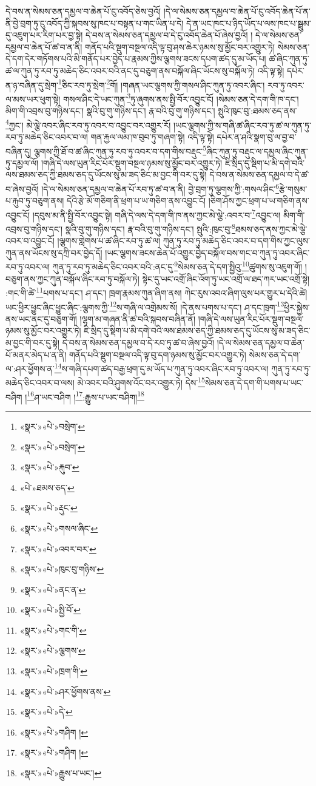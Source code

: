 དེ་བས་ན་སེམས་ཅན་དམྱལ་བ་ཆེན་པོ་ངུ་འབོད་ཅེས་བྱའོ། །དེ་ལ་སེམས་ཅན་དམྱལ་བ་ཆེན་པོ་ངུ་འབོད་ཆེན་པོ་ན་ནི་བྱེ་བྲག་ཏུ་ངུ་འབོད་ཀྱི་སྐབས་སུ་ཁང་པ་བསྟན་པ་གང་ཡིན་པ་དེ། དེ་ན་ཡང་ཁང་པ་ཉིད་ཡོད་པ་ལས་ཁང་པ་སྦྲུམ་དུ་འཇུག་པར་རིག་པར་བྱ་སྟེ། དེ་བས་ན་སེམས་ཅན་དམྱལ་བ་དེ་ངུ་འབོད་ཆེན་པོ་ཞེས་བྱའོ། །
དེ་ལ་སེམས་ཅན་དམྱལ་བ་ཆེན་པོ་ཚ་བ་ན་ནི། གནོད་པའི་སྡུག་བསྔལ་འདི་ལྟ་བུ་ཤས་ཆེར་ཉམས་སུ་མྱོང་བར་འགྱུར་ཏེ། སེམས་ཅན་དེ་དག་དེར་གཏོགས་པའི་མི་གནོད་པར་བྱེད་པ་རྣམས་ཀྱིས་ལྕགས་ཟངས་དཔག་ཚད་དུ་མ་ཡོད་པ། ཚ་ཞིང་ཀུན་ཏུ་ཚ་ལ་ཀུན་ཏུ་རབ་ཏུ་མཆེད་ཅིང་འབར་བའི་ནང་དུ་བཅུག་ནས་བསྐོལ་ཞིང་ཡོངས་སུ་བསྐོལ་ཏེ། འདི་ལྟ་སྟེ། དཔེར་ན་ཉ་བཞིན་དུ་སྲེག་\footnote{«སྣར་»«པེ་»བསྲེག་}ཅིང་རབ་ཏུ་སྲེག་\footnote{«སྣར་»«པེ་»བསྲེག་}གོ། །གཞན་ཡང་ལྕགས་ཀྱི་གསལ་ཤིང་ཀུན་ཏུ་འབར་ཞིང་། རབ་ཏུ་འབར་ལ་མས་ཡར་ཕུག་སྟེ། གསལ་ཤིང་དེ་ཡང་ཀུན་\footnote{«སྣར་»«པེ་»རྐུབ་}ཏུ་ཞུགས་ནས་སྤྱི་བོར་འབྱུང་ངོ། །སེམས་ཅན་དེ་དག་གི་ཁ་དང་། མིག་གི་འབྲས་བུ་གཉིས་དང་། སྣའི་བུ་གུ་གཉིས་དང་། རྣ་བའི་བུ་གུ་གཉིས་དང་། སྤུའི་ཁུང་བུ་:ཐམས་ཅད་ནས་\footnote{«པེ་»ཐམས་ཅད་}ཀྱང་། མེ་ལྕེ་འབར་ཞིང་རབ་ཏུ་འབར་བ་འབྱུང་བར་འགྱུར་རོ། །ཡང་ལྕགས་ཀྱི་ས་གཞི་ཚ་ཞིང་རབ་ཏུ་ཚ་ལ་ཀུན་ཏུ་རབ་ཏུ་མཆེད་ཅིང་འབར་བ་ལ། གན་རྐྱལ་ལམ་ཁ་བུབ་ཏུ་གཞག་སྟེ། འདི་ལྟ་སྟེ། དཔེར་ན་ཤའི་སྣག་བུ་ལ་བྱ་བ་བཞིན་དུ། ལྕགས་ཀྱི་ཐོ་བ་ཚ་ཞིང་ཀུན་ཏུ་རབ་ཏུ་འབར་བ་དག་གིས་བརྡུང་\footnote{«སྣར་»«པེ་»རྡུང་}ཞིང་ཀུན་ཏུ་བརྡུང་ལ་དམྱལ་ཞིང་ཀུན་ཏུ་དམྱལ་ལོ། །གཞི་དེ་ལས་ཡུན་རིང་པོར་སྡུག་བསྔལ་ཉམས་སུ་མྱོང་བར་འགྱུར་ཏེ། ཇི་སྲིད་དུ་སྡིག་པ་མི་དགེ་བའི་ལས་ཐམས་ཅད་ཀྱི་ཐམས་ཅད་དུ་ཡོངས་སུ་མ་ཟད་ཅིང་མ་བྱང་གི་བར་དུ་སྟེ། དེ་བས་ན་སེམས་ཅན་དམྱལ་བ་དེ་ཚ་བ་ཞེས་བྱའོ། །དེ་ལ་སེམས་ཅན་དམྱལ་བ་ཆེན་པོ་རབ་ཏུ་ཚ་བ་ན་ནི། བྱེ་བྲག་ཏུ་ལྕགས་ཀྱི་:གསལ་ཤིང་\footnote{«སྣར་»«པེ་»གསལ་ཞིང་}རྩེ་གསུམ་པ་རྐུབ་ཏུ་བཅུག་ནས། དེའི་རྩེ་མོ་གཅིག་ནི་ཕྲག་པ་ཡ་གཅིག་ནས་འབྱུང་ངོ། །ཅིག་ཤོས་ཀྱང་ཕྲག་པ་ཡ་གཅིག་ནས་འབྱུང་ངོ། །དབུས་མ་ནི་སྤྱི་བོར་འབྱུང་སྟེ། གཞི་དེ་ལས་དེ་དག་གི་ཁ་ནས་ཀྱང་མེ་ལྕེ་:འབར་བ་\footnote{«སྣར་»«པེ་»འབར་བར་}འབྱུང་ལ། མིག་གི་འབྲས་བུ་གཉིས་དང་། སྣའི་བུ་གུ་གཉིས་དང་། རྣ་བའི་བུ་གུ་གཉིས་དང་། སྤུའི་:ཁུང་བུ་\footnote{«སྣར་»«པེ་»ཁུང་བུ་གཉིས་}ཐམས་ཅད་ནས་ཀྱང་མེ་ལྕེ་འབར་བ་འབྱུང་ངོ། །ལྕགས་གླེགས་པ་ཚ་ཞིང་རབ་ཏུ་ཚ་ལ། ཀུན་ཏུ་རབ་ཏུ་མཆེད་ཅིང་འབར་བ་དག་གིས་ཀྱང་ལུས་ཀུན་ནས་ཡོངས་སུ་དཀྲི་བར་བྱེད་དོ། །ཡང་ལྕགས་ཟངས་ཆེན་པོ་འགྱུར་བྱེད་བསྐོལ་བས་གང་བ་ཀུན་ཏུ་འབར་ཞིང་རབ་ཏུ་འབར་ལ། ཀུན་ཏུ་རབ་ཏུ་མཆེད་ཅིང་འབར་བའི་:ནང་དུ་\footnote{«སྣར་»«པེ་»ནང་ན་}སེམས་ཅན་དེ་དག་སྤྱིའུ་\footnote{«སྣར་»«པེ་»སྤྱི་བོ་}ཚུགས་སུ་འཇུག་གོ། །བཅུག་ནས་ཀྱང་ཀུན་བསྐོལ་ཞིང་རབ་ཏུ་བསྐོལ་ཏེ། སྟེང་དུ་ཡང་འགྲོ་ཞིང་འོག་ཏུ་ཡང་འགྲོ་ལ་ཐད་ཀར་ཡང་འགྲོ་སྟེ། :གང་གི་ཚེ་\footnote{«སྣར་»«པེ་»གང་གི་}པགས་པ་དང་། ཤ་དང་། ཁྲག་རྣམས་ཀུན་ཞིག་ནས། ཀེང་རུས་འབའ་ཞིག་ལུས་པར་གྱུར་པ་དེའི་ཚེ། ཡང་ཕྱིར་ཕྱུང་ཞིང་ཕྱུང་ཞིང་:ལྕགས་ཀྱི་\footnote{«སྣར་»«པེ་»ལྕགས་}ས་གཞི་ལ་འགྲེམས་སོ། །དེ་ནས་པགས་པ་དང་། ཤ་དང་ཁྲག་\footnote{«སྣར་»«པེ་»ཁྲག་གི་}ཕྱིར་སྐྱེས་ནས་ཡང་ནང་དུ་བཅུག་གོ། །ལྷག་མ་གཞན་ནི་ཚ་བའི་སྐབས་བཞིན་ནོ། །གཞི་དེ་ལས་ཡུན་རིང་པོར་སྡུག་བསྔལ་ཉམས་སུ་མྱོང་བར་འགྱུར་ཏེ། ཇི་སྲིད་དུ་སྡིག་པ་མི་དགེ་བའི་ལས་ཐམས་ཅད་ཀྱི་ཐམས་ཅད་དུ་ཡོངས་སུ་མ་ཟད་ཅིང་མ་བྱང་གི་བར་དུ་སྟེ། དེ་བས་ན་སེམས་ཅན་དམྱལ་བ་དེ་རབ་ཏུ་ཚ་བ་ཞེས་བྱའོ། །དེ་ལ་སེམས་ཅན་དམྱལ་བ་ཆེན་པོ་མནར་མེད་པ་ན་ནི། གནོད་པའི་སྡུག་བསྔལ་འདི་ལྟ་བུ་དག་ཉམས་སུ་མྱོང་བར་འགྱུར་ཏེ། སེམས་ཅན་དེ་དག་ལ་:ཤར་ཕྱོགས་ན་\footnote{«སྣར་»«པེ་»ཤར་ཕྱོགས་ནས་}ས་གཞི་དཔག་ཚད་བརྒྱ་ཕྲག་དུ་མ་ཡོད་པ་ཀུན་ཏུ་འབར་ཞིང་རབ་ཏུ་འབར་ལ། ཀུན་ཏུ་རབ་ཏུ་མཆེད་ཅིང་འབར་བ་ལས། མེ་འབར་བའི་ཤུགས་འོང་བར་འགྱུར་ཏེ། དེས་\footnote{«སྣར་»«པེ་»དེ་}སེམས་ཅན་དེ་དག་གི་པགས་པ་ཡང་བཤིག །\footnote{«སྣར་»«པེ་»གཤིག །}ཤ་ཡང་བཤིག །\footnote{«སྣར་»«པེ་»གཤིག །}:རྒྱུས་པ་ཡང་བཤིག།\footnote{«སྣར་»«པེ་»རྒྱུས་པ་ཡང་།} 